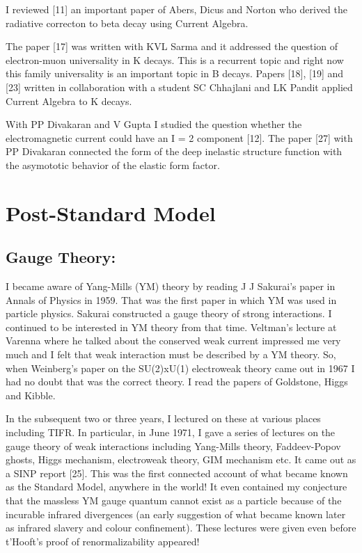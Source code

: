 I reviewed [11] an important paper of Abers, Dicus and Norton who 
derived the radiative correcton to beta decay using Current Algebra.

The paper [17] was written with KVL Sarma and it addressed the question 
of electron-muon universality in K decays. This is a recurrent topic and 
right now this family universality is an impo\-rtant topic in B decays. 
Papers [18], [19] and [23] written in collaboration with a student SC 
Chhajlani and LK Pandit appli\-ed Current Algebra to K decays.

With PP Divakaran and V Gupta I studied the question whe\-ther the 
electromagnetic current could have an I = 2 compo\-nent [12]. The paper 
[27] with PP Divakaran connected the form of the deep inelastic 
structure function with the asymototic behavior of the elastic form 
factor.

\vspace{-\topsep}
\section*{Post-Standard Model}

\subsection*{Gauge Theory:}
\vskip -6pt
I became aware of Yang-Mills (YM) theory by reading J J Sakurai's paper 
in Annals of Physics in 1959. That was the first paper in which YM was 
used in particle physics. Sakurai constructed a gauge theory of strong 
interactions. I continued to be intere\-sted in YM theory from that time. 
Veltman's lecture at Varenna where he talked about the conserved weak 
current impressed me very much and I felt that weak interaction must be 
described by a YM theory. So, when Weinberg's paper on the SU(2)xU(1) 
electroweak theory came out in 1967 I had no doubt that was the correct 
theory. I read the papers of Goldstone, Higgs and Kibble.

In the subsequent two or three years, I lectured on these at various 
places including TIFR. In particular, in June 1971, I gave a series of 
lectures on the gauge theory of weak interactions including Yang-Mills 
theory, Faddeev-Popov ghosts, Higgs mecha\-nism, electroweak theory, GIM 
mechanism etc. It came out as a SINP report [25]. This was the first 
connected account of what became known as the Standard Model, anywhere 
in the world! It even contained my conjecture that the massless YM gauge 
quantum cannot exist as a particle because of the incurable infrared 
divergences (an early suggestion of what became known later as infrared 
slavery and colour confinement). These lectures were given even before 
t'Hooft's proof of renorma\-lizability appeared!

